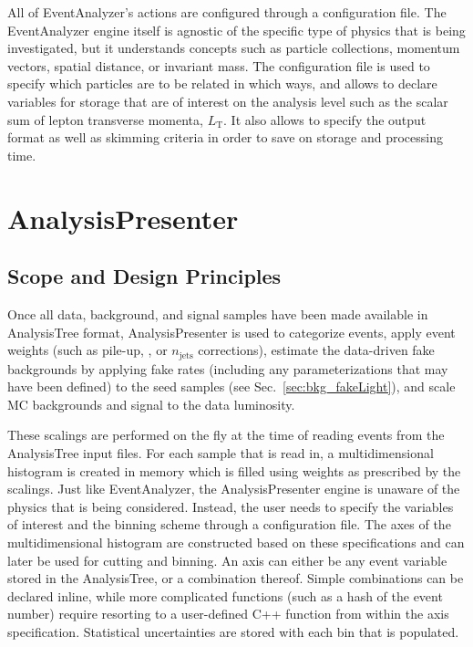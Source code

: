 All of EventAnalyzer's actions are configured through a configuration file. The EventAnalyzer engine itself is agnostic of the specific type of physics that is being investigated, but it understands concepts such as particle collections, momentum vectors, spatial distance, or invariant mass. The configuration file is used to specify which particles are to be related in which ways, and allows to declare variables for storage that are of interest on the analysis level such as the scalar sum of lepton transverse momenta, $L_\textrm{T}$. It also allows to specify the output format as well as skimming criteria in order to save on storage and processing time.

\section{AnalysisPresenter}
\subsection{Scope and Design Principles}
Once all data, background, and signal samples have been made available in AnalysisTree format, AnalysisPresenter is used to categorize events, apply event weights (such as pile-up, \pt, or $n_\textrm{jets}$ corrections), estimate the data-driven fake backgrounds by applying fake rates (including any parameterizations that may have been defined) to the seed samples (see Sec.~\ref{sec:bkg_fakeLight}), and scale MC backgrounds and signal to the data luminosity.

These scalings are performed on the fly at the time of reading events from the AnalysisTree input files. For each sample that is read in, a multidimensional histogram is created in memory which is filled using weights as prescribed by the scalings. Just like EventAnalyzer, the AnalysisPresenter engine is unaware of the physics that is being considered. Instead, the user needs to specify the variables of interest and the binning scheme through a configuration file. The axes of the multidimensional histogram are constructed based on these specifications and can later be used for cutting and binning. An axis can either be any event variable stored in the AnalysisTree, or a combination thereof. Simple combinations can be declared inline, while more complicated functions (such as a hash of the event number) require resorting to a user-defined C++ function from within the axis specification. Statistical uncertainties are stored with each bin that is populated.

